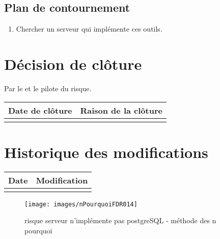 \flushleft
\subsection*{Plan de contournement}

\begin{enumerate}
	\item Chercher un serveur qui implémente ces outils. 
\end{enumerate}

\section*{Décision de clôture}
Par le \CP{} et le pilote du risque.
\begin{table}[H]
\centering
	\begin{tabularx}{16.8cm}{|X|X|}
	\hline
	\rowcolor{gray!40} Date de clôture & Raison de la clôture \\
	\hline
	  & \\
	\hline
	\end{tabularx}
\end{table}

\section*{Historique des modifications}
\begin{table}[H]
\centering
	\begin{tabularx}{16.8cm}{|X|X|}
	\hline
	\rowcolor{gray!40} Date & Modification \\
	\hline
	  & \\
	\hline
	\end{tabularx}
\end{table}
\newpage


\begin{figure}
	\centering
	\texttt{[image: images/nPourquoiFDR014]}
	\caption{\label{serveur pas postgre}risque serveur n'implémente pas postgreSQL - méthode des n pourquoi}
\end{figure}